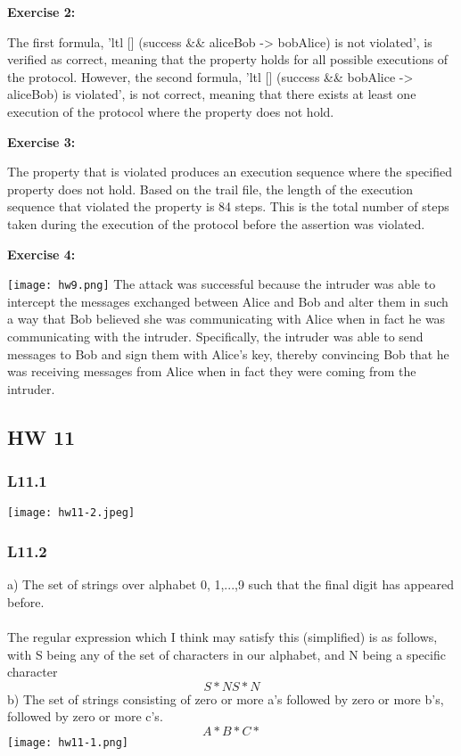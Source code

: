 \documentclass{article}
\theoremstyle{theorem}
\theoremstyle{definition}
\theoremstyle{remark}
\begin{document}
{\bf Exercise 2:}

The first formula, 'ltl {[] (success \&\& aliceBob -> bobAlice)} is not violated', is verified as correct, meaning that the property holds for all possible executions of the protocol. However, the second formula, 'ltl {[] (success \&\& bobAlice -> aliceBob)} is violated', is not correct, meaning that there exists at least one execution of the protocol where the property does not hold.


{\bf Exercise 3:}

The property that is violated produces an execution sequence where the specified property does not hold. Based on the trail file, the length of the execution sequence that violated the property is 84 steps. This is the total number of steps taken during the execution of the protocol before the assertion was violated.

{\bf Exercise 4:}

\texttt{[image: hw9.png]}
The attack was successful because the intruder was able to intercept the messages exchanged between Alice and Bob and alter them in such a way that Bob believed she was communicating with Alice when in fact he was communicating with the intruder. Specifically, the intruder was able to send messages to Bob and sign them with Alice's key, thereby convincing Bob that he was receiving messages from Alice when in fact they were coming from the intruder.

\subsection{HW 11}
\subsubsection{L11.1}
\texttt{[image: hw11-2.jpeg]}

\subsubsection{L11.2}

a) The set of strings over alphabet {0, 1,...,9}  such that the final digit has appeared before.
\\\\
The regular expression which I think may satisfy this (simplified) is as follows, with S being any of the set of characters in our alphabet, and N being a specific character
\[S*NS*N\]
b) The set of strings consisting of zero or more a's followed by zero or more b's, followed by zero or more c's.
\[A*B*C*\]
\texttt{[image: hw11-1.png]}
\end{document}
